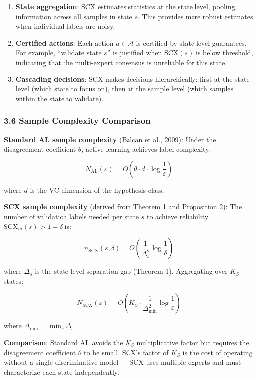 \documentclass[
  12pt,
]{ctexart}
\begin{document}
\begin{enumerate}
\def\labelenumi{\arabic{enumi}.}
\item
  \textbf{State aggregation}: SCX estimates statistics at the state
  level, pooling information across all samples in state \(s\). This
  provides more robust estimates when individual labels are noisy.
\item
  \textbf{Certified actions}: Each action \(a \in \mathcal{A}\) is
  certified by state-level guarantees. For example, ``validate state
  \(s\)'' is justified when \(\text{SCX}(s)\) is below threshold,
  indicating that the multi-expert consensus is unreliable for this
  state.
\item
  \textbf{Cascading decisions}: SCX makes decisions hierarchically:
  first at the state level (which state to focus on), then at the sample
  level (which samples within the state to validate).
\end{enumerate}

\subsubsection{3.6 Sample Complexity
Comparison}\label{sample-complexity-comparison}

\textbf{Standard AL sample complexity} (Balcan et al., 2009): Under the
disagreement coefficient \(\theta\), active learning achieves label
complexity:

\[N_{\text{AL}}(\varepsilon) = O\left(\theta \cdot d \cdot \log\frac{1}{\varepsilon}\right)\]

where \(d\) is the VC dimension of the hypothesis class.

\textbf{SCX sample complexity} (derived from Theorem 1 and Proposition
2): The number of validation labels needed per state \(s\) to achieve
reliability \(\text{SCX}_m(s) > 1 - \delta\) is:

\[n_{\text{SCX}}(s, \delta) = O\left(\frac{1}{\Delta_s^2} \log\frac{1}{\delta}\right)\]

where \(\Delta_s\) is the state-level separation gap (Theorem 1).
Aggregating over \(K_S\) states:

\[N_{\text{SCX}}(\varepsilon) = O\left(K_S \cdot \frac{1}{\Delta_{\min}^2} \log\frac{1}{\varepsilon}\right)\]

where \(\Delta_{\min} = \min_s \Delta_s\).

\textbf{Comparison}: Standard AL avoids the \(K_S\) multiplicative
factor but requires the disagreement coefficient \(\theta\) to be small.
SCX's factor of \(K_S\) is the cost of operating without a single
discriminative model --- SCX uses multiple experts and must characterize
each state independently.
\end{document}

